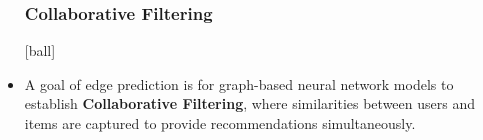 \documentclass{beamer}
\begin{document}
\begin{frame}[fragile]
\begin{itemize}
\frametitle{Collaborative Filtering}
[ball]

\item A goal of edge prediction is for graph-based neural network models to establish \textbf{Collaborative Filtering}, where similarities between users and items are captured to provide recommendations simultaneously.

\vspace{0.5cm}
\hspace{-0.5cm}
\begin{minipage}[c]{0.8\textwidth}
    \hspace{0.8cm}
    
\end{minipage}

\end{itemize}
\end{frame}


\begin{frame}
\frametitle{}

\begin{minipage}[c]{0.8\textwidth}
    \hspace{1cm}
    
\end{minipage}

\end{frame}

\end{document}
